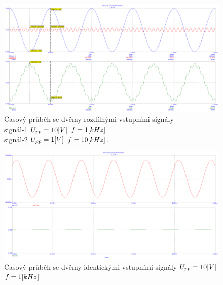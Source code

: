 \documentclass{article}
\begin{document}
\begin{figure}[H]
  \begin{minipage}[t]{\textwidth}
    \centering
    \includegraphics[width=\textwidth]{PC/ukol3/transient4.png}
    Časový průběh se dvěmy rozdílnými vstupními signály \\
    signál-1 \(U_{pp} = 10\-[V]\) \(f = 1\-[kHz]\) \\
    signál-2 \(U_{pp} = 1\-[V]\) \(f = 10\-[kHz]\).
  \end{minipage}
\end{figure}

\begin{figure}[H]
  \begin{minipage}[t]{\textwidth}
    \centering
    \includegraphics[width=\textwidth]{PC/ukol3/nula_vzstup.png}
    Časový průběh se dvěmy identickými vstupními signály \(U_{pp} = 10\-[V]\) \(f = 1\-[kHz]\)
  \end{minipage}
\end{figure}
\end{document}
